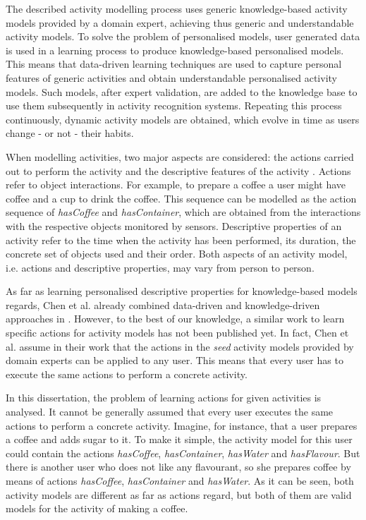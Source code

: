 The described activity modelling process uses generic knowledge-based activity models provided by a domain expert, achieving thus generic and understandable activity models. To solve the problem of personalised models, user generated data is used in a learning process to produce knowledge-based personalised models. This means that data-driven learning techniques are used to capture personal features of generic activities and obtain understandable personalised activity models. Such models, after expert validation, are added to the knowledge base to use them subsequently in activity recognition systems. Repeating this process continuously, dynamic activity models are obtained, which evolve in time as users change - or not - their habits.


When modelling activities, two major aspects are considered: the actions carried out to perform the activity and the descriptive features of the activity \cite{Chen2014}. Actions refer to object interactions. For example, to prepare a coffee a user might have coffee and a cup to drink the coffee. This sequence can be modelled as the action sequence of \textit{hasCoffee} and \textit{hasContainer}, which are obtained from the interactions with the respective objects monitored by sensors. Descriptive properties of an activity refer to the time when the activity has been performed, its duration, the concrete set of objects used and their order. Both aspects of an activity model, i.e. actions and descriptive properties, may vary from person to person. 

As far as learning personalised descriptive properties for knowledge-based models regards, Chen et al. already combined data-driven and knowledge-driven approaches in \cite{Chen2014}. However, to the best of our knowledge, a similar work to learn specific actions for activity models has not been published yet. In fact, Chen et al. assume in their work that the actions in the \textit{seed} activity models provided by domain experts can be applied to any user. This means that every user has to execute the same actions to perform a concrete activity.

In this dissertation, the problem of learning actions for given activities is analysed. It cannot be generally assumed that every user executes the same actions to perform a concrete activity. Imagine, for instance, that a user prepares a coffee and adds sugar to it. To make it simple, the activity model for this user could contain the actions \textit{hasCoffee}, \textit{hasContainer}, \textit{hasWater} and \textit{hasFlavour}. But there is another user who does not like any flavourant, so she prepares coffee by means of actions \textit{hasCoffee}, \textit{hasContainer} and  \textit{hasWater}. As it can be seen, both activity models are different as far as actions regard, but both of them are valid models for the activity of making a coffee. 

